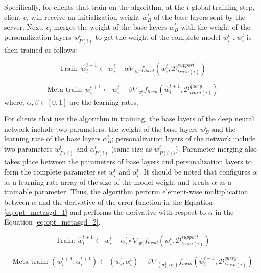 \documentclass[runningheads]{llncs}
\begin{document}
Specifically, for clients that train on the  algorithm, at the $t$ global training step, client $c_i$ will receive an initialization weight $w_B^t$ of the base layers sent by the server. Next, $c_i$ merges the weight of the base layers $w_B^t$ with the weight of the personalization layers $w_{P(i)}^t$ to get the weight of the complete model $w_i^t$ . $w_i^t$ is then trained as follows:

\begin{dmath}
    \text{Train: } \hat{w}_{i}^{t+1} \gets w_{i}^t - \alpha\nabla_{w_i^t} f_{local}\left(w_{i}^t, \mathcal{D}_{train(i)}^{support}\right)
\end{dmath}

\begin{dmath}
    \text{Meta-train: } w_{i}^{t+1} \gets w_{i}^t - \beta\nabla_{w_i^t} f_{local}\left(\hat{w}_{i}^{t+1}, \mathcal{D}_{train(i)}^{query}\right)
\end{dmath} where, $\alpha, \beta\in [0,1]$ are the learning rates.

For clients that use the  algorithm in training, the base layers of the deep neural network include two parameters: the weight of the base layers $w_B^{t}$ and the learning rate of the base layers $\alpha_B^{t}$; personalization layers of the network include two parameters $w_{P(i)}^{t}$ and $\alpha_{P(i)}^{t}$ (same size as $w_{P(i) )}^{t}$). Parameter merging also takes place between the parameters of base layers and personalization layers to form the complete parameter set $w_i^t$ and $\alpha_i^t$. It should be noted that  configures $\alpha$ as a learning rate array of the size of the model weight and treats $\alpha$ as a trainable parameter. Thus, the algorithm perform element-wise multiplication between $\alpha$ and the derivative of the error function in the Equation \ref{eq:opt_metasgd_1} and performs the derivative with respect to $\alpha$ in the Equation \ref{eq:opt_metasgd_2}.

\begin{dmath}
    \label{eq:opt_metasgd_1}
    \text{Train: } \hat{w}_{i}^{t+1} \gets w_{i}^t - \alpha_i^t\circ\nabla_{w_i^t} f_{local}\left(w_{i}^t, \mathcal{D}_{train(i)}^{support}\right)
\end{dmath}

\begin{dmath}
    \label{eq:opt_metasgd_2}
    \text{Meta-train: } (w_{i}^{t+1}, \alpha_i^{t+1}) \gets (w_{i}^t, \alpha_{i}^{t}) - \beta\nabla_{(w_i^t, \alpha_i^t)} f_{local}\left(\hat{w}_{i}^{t+1}, \mathcal{D}_{train(i)}^{query}\right)
\end{dmath}
\end{document}
